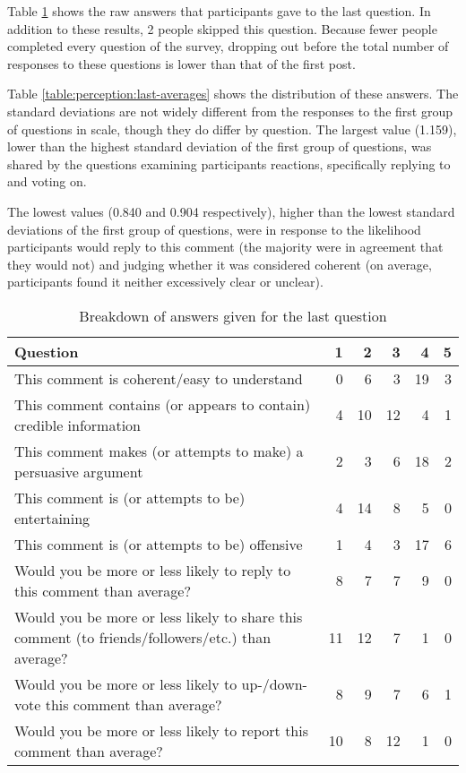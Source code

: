 Table \ref{table:perception:last-raw} shows the raw answers that participants gave to the last question. In addition to these results, 2 people skipped this question. Because fewer people completed every question of the survey, dropping out before the total number of responses to these questions is lower than that of the first post.

Table \ref{table:perception:last-averages} shows the distribution of these answers. The standard deviations are not widely different from the responses to the first group of questions in scale, though they do differ by question. The largest value (1.159), lower than the highest standard deviation of the first group of questions, was shared by the questions examining participants reactions, specifically replying to and voting on.

The lowest values (0.840 and 0.904 respectively), higher than the lowest standard deviations of the first group of questions, were in response to the likelihood participants would reply to this comment (the majority were in agreement that they would not) and judging whether it was considered coherent (on average, participants found it neither excessively clear or unclear).


\begin{table}
\centering
\caption{Breakdown of answers given for the last question}
\label{table:perception:last-raw}
\begin{tabular}{ p{6cm} | r | r | r | r | r }
\textbf{Question} & \textbf{1} &  \textbf{2} &  \textbf{3} &  \textbf{4} &  \textbf{5}\\
\hline
This comment is coherent/easy to understand  &  0 & 6 & 3 & 19 & 3 \\
\hline
This comment contains (or appears to contain) credible information  &  4 & 10 & 12 & 4 & 1 \\
\hline
This comment makes (or attempts to make) a persuasive argument  &  2 & 3 & 6 & 18 & 2 \\
\hline
This comment is (or attempts to be) entertaining  &  4 & 14 & 8 & 5 & 0 \\
\hline
This comment is (or attempts to be) offensive  &  1 & 4 & 3 & 17 & 6 \\
\hline
Would you be more or less likely to reply to this comment than average?  &  8 & 7 & 7 & 9 & 0 \\
\hline
Would you be more or less likely to share this comment (to friends/followers/etc.) than average?  &  11 & 12 & 7 & 1 & 0 \\
\hline
Would you be more or less likely to up-/down-vote this comment than average?  &  8 & 9 & 7 & 6 & 1 \\
\hline
Would you be more or less likely to report this comment than average?  &  10 & 8 & 12 & 1 & 0 \\
\end{tabular}
\end{table}


